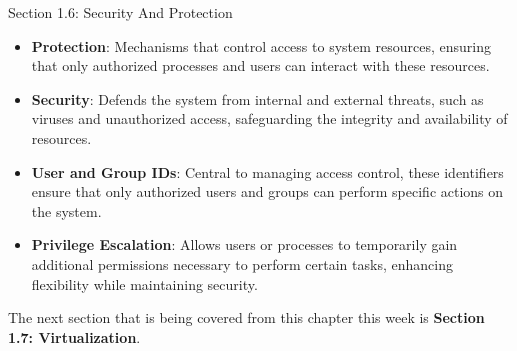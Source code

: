 \begin{notes}{Section 1.6: Security And Protection}
\begin{highlight}
    \begin{itemize}
        \item \textbf{Protection}: Mechanisms that control access to system resources, ensuring that only authorized processes and users can interact with these resources.
        \item \textbf{Security}: Defends the system from internal and external threats, such as viruses and unauthorized access, safeguarding the integrity and availability of resources.
        \item \textbf{User and Group IDs}: Central to managing access control, these identifiers ensure that only authorized users and groups can perform specific actions on the system.
        \item \textbf{Privilege Escalation}: Allows users or processes to temporarily gain additional permissions necessary to perform certain tasks, enhancing flexibility while maintaining security.
    \end{itemize}
    
    \end{highlight}
\end{notes}

The next section that is being covered from this chapter this week is \textbf{Section 1.7: Virtualization}.

